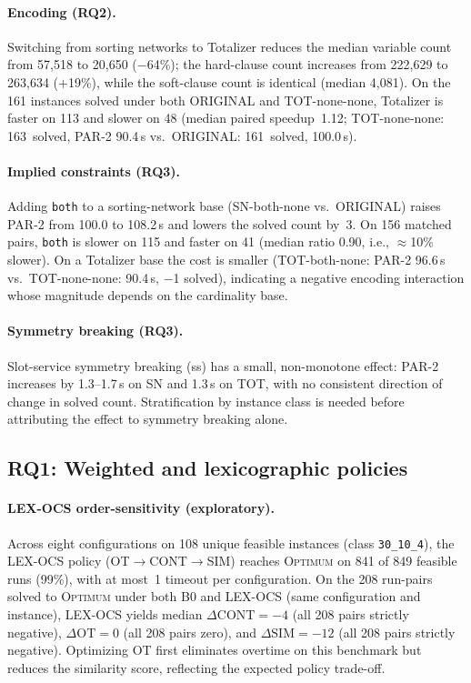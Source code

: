 \paragraph{Encoding (RQ2).}
Switching from sorting networks to Totalizer reduces the median variable count
from 57,518 to 20,650 ($-$64\%); the hard-clause count increases from 222,629
to 263,634 ($+$19\%), while the soft-clause count is identical (median 4,081).
On the 161 instances solved under both ORIGINAL and TOT-none-none, Totalizer
is faster on 113 and slower on 48 (median paired speedup~1.12; TOT-none-none:
163~solved, PAR-2 90.4\,s vs.\ ORIGINAL: 161~solved, 100.0\,s).

\paragraph{Implied constraints (RQ3).}
Adding \texttt{both} to a sorting-network base (SN-both-none vs.\ ORIGINAL)
raises PAR-2 from 100.0 to 108.2\,s and lowers the solved count by~3.
On 156 matched pairs, \texttt{both} is slower on 115 and faster on 41
(median ratio 0.90, i.e., $\approx$10\% slower).
On a Totalizer base the cost is smaller (TOT-both-none: PAR-2 96.6\,s vs.\
TOT-none-none: 90.4\,s, $-$1 solved), indicating a negative encoding
interaction whose magnitude depends on the cardinality base.

\paragraph{Symmetry breaking (RQ3).}
Slot-service symmetry breaking (ss) has a small, non-monotone effect:
PAR-2 increases by 1.3--1.7\,s on SN and 1.3\,s on TOT, with no consistent
direction of change in solved count.  Stratification by instance class is
needed before attributing the effect to symmetry breaking alone.

\subsection{RQ1: Weighted and lexicographic policies}

\paragraph{LEX-OCS order-sensitivity (exploratory).}
Across eight configurations on 108 unique feasible instances (class
\texttt{30\_10\_4}), the LEX-OCS policy (OT$\to$CONT$\to$SIM) reaches
\textsc{Optimum} on 841 of 849 feasible runs (99\%),
with at most~1 timeout per configuration.
On the 208 run-pairs solved to \textsc{Optimum} under both B0 and LEX-OCS
(same configuration and instance), LEX-OCS yields median
$\Delta\mathrm{CONT}=-4$ (all 208 pairs strictly negative),
$\Delta\mathrm{OT}=0$ (all 208 pairs zero), and
$\Delta\mathrm{SIM}=-12$ (all 208 pairs strictly negative).
Optimizing OT first eliminates overtime on this benchmark but reduces the
similarity score, reflecting the expected policy trade-off.

